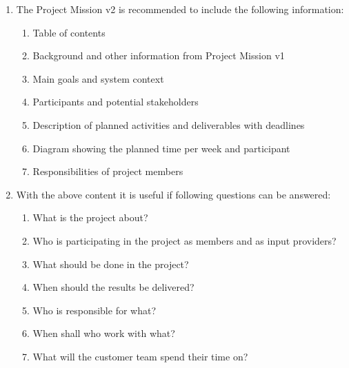 \documentclass[10pt,a4paper]{article}
\begin{document}
 \begin{enumerate}
 \item The Project Mission v2 is recommended to include the following information:
\begin{enumerate}
\item Table of contents
 \item Background and other information from Project Mission v1 
 \item	Main goals and system context
 \item	Participants and potential stakeholders 
 \item	Description of planned activities and deliverables with deadlines
 \item	Diagram showing the planned time per week and participant 
 \item	Responsibilities of project members 
\end{enumerate}

 \item With the above content it is useful if following questions can be answered:
 \begin{enumerate}
 \item          What is the project about?
 \item          Who is participating in the project as members and as input providers?
 \item          What should be done in the project?
 \item          When should the results be delivered?
 \item          Who is responsible for what?
 \item          When shall who work with what?
 \item		What will the customer team spend their time on? 
\end{enumerate}
\end{enumerate}

\newpage
\end{document}
